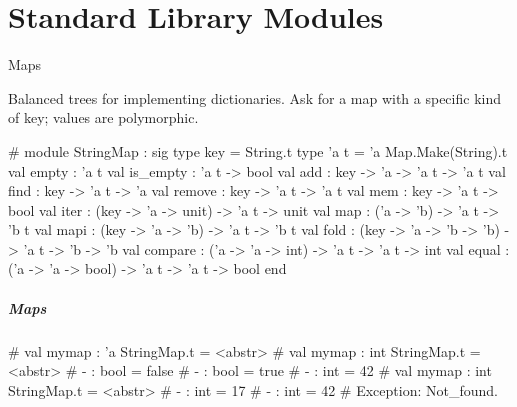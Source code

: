\documentclass{plt}
\begin{document}
\part{Standard Library Modules}

\begin{frame}[fragile]{Maps}

\begin{scriptsize}
Balanced trees for implementing dictionaries.  Ask for a map with a
specific kind of key; values are polymorphic.

\begin{interactive}
# 
module StringMap :
  sig
    type key = String.t
    type 'a t = 'a Map.Make(String).t
    val empty : 'a t
    val is_empty : 'a t -> bool
    val add : key -> 'a -> 'a t -> 'a t
    val find : key -> 'a t -> 'a
    val remove : key -> 'a t -> 'a t
    val mem : key -> 'a t -> bool
    val iter : (key -> 'a -> unit) -> 'a t -> unit
    val map : ('a -> 'b) -> 'a t -> 'b t
    val mapi : (key -> 'a -> 'b) -> 'a t -> 'b t
    val fold : (key -> 'a -> 'b -> 'b) -> 'a t -> 'b -> 'b
    val compare : ('a -> 'a -> int) -> 'a t -> 'a t -> int
    val equal : ('a -> 'a -> bool) -> 'a t -> 'a t -> bool
  end
\end{interactive}
\end{scriptsize}

\end{frame}

\begin{frame}[fragile]
  \frametitle{Maps}

\begin{interactive}
# 
val mymap : 'a StringMap.t = <abstr>
# 
val mymap : int StringMap.t = <abstr>
# 
- : bool = false
# 
- : bool = true
# 
- : int = 42
# 
val mymap : int StringMap.t = <abstr>
# 
- : int = 17
# 
- : int = 42
# 
Exception: Not_found.
\end{interactive}
\end{frame}
\end{document}
